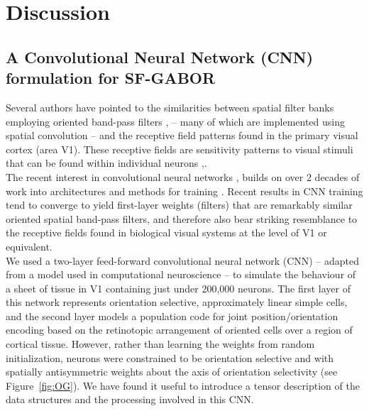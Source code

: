 \section{Discussion}
\subsection{A Convolutional Neural Network (CNN) formulation for SF-GABOR}


Several authors have pointed to the similarities between spatial filter banks employing oriented band-pass filters \cite{wandell1995foundations},\cite{petrou2008next} -- many of which are implemented using spatial convolution -- and the receptive field patterns found in the primary visual cortex (area V1).  These receptive fields are sensitivity patterns to visual stimuli that can be found within individual neurons \cite{olshausen1997sparse},\cite{ringach2002spatial}. \\

The recent interest in convolutional neural networks \cite{krizhevsky2012imagenet},\cite{ji20133d} builds on over 2 decades of work into architectures and methods for training \cite{lecun1995convolutional}. Recent results in CNN training tend to converge to yield first-layer weights (filters) that are remarkably similar oriented spatial band-pass filters, and therefore also bear striking resemblance to the receptive fields found in biological visual systems at the level of V1 or equivalent.\\

We used a two-layer feed-forward convolutional neural network (CNN) -- adapted from a model used in computational neuroscience -- to simulate the behaviour of a sheet of tissue in V1 containing just under 200,000 neurons. The first layer of this network represents orientation selective, approximately linear simple cells, and the second layer models a population code for joint position/orientation encoding based on the retinotopic arrangement of oriented cells over a region of cortical tissue.  However, rather than learning the weights from random initialization, neurons were constrained to be orientation selective and with spatially antisymmetric weights about the axis of orientation selectivity (see Figure~\ref{fig:OG}).  We have found it useful to introduce a tensor description of the data structures and the processing involved in this CNN.

